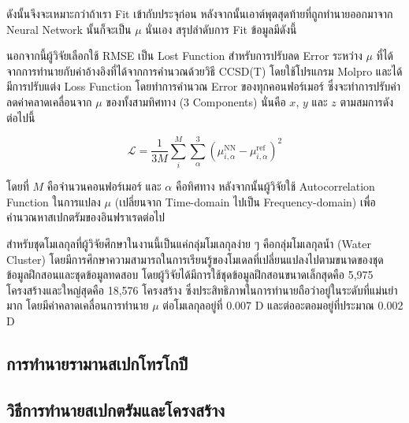 \noindent ดังนั้นจึงจะเหมาะกว่าถ้าเรา Fit เข้ากับประจุก่อน หลังจากนั้นเอาต์พุตสุดท้ายที่ถูกทำนายออกมาจาก Neural Network นั้นก็จะเป็น $\mu$ นั่นเอง สรุปลำดับการ Fit ข้อมูลมีดังนี้


นอกจากนี้ผู้วิจัยเลือกใช้ RMSE เป็น Lost Function สำหรับการปรับลด Error ระหว่าง $\mu$ ที่ได้จากการทำนายกับค่าอ้างอิงที่ได้จากการคำนวณด้วยวิธี CCSD(T) โดยใช้โปรแกรม Molpro และได้มีการปรับแต่ง Loss Function โดยทำการคำนวณ Error ของทุกคอนฟอร์เมอร์ ซึ่งจะทำการปรับค่าลดค่าคลาดเคลื่อนจาก $\mu$ ของทั้งสามทิศทาง (3 Components) นั่นคือ $x$, $y$ และ $z$ ตามสมการดังต่อไปนี้

\begin{equation}
    \mathcal{L} = \frac{1}{3M} \sum^{M}_{i} \sum^{3}_{\alpha} (\mu^{\text{NN}}_{i,\alpha}
    - \mu^{\text{ref}}_{i,\alpha})^{2}
\end{equation}

\noindent โดยที่ $M$ คือจำนวนคอนฟอร์เมอร์ และ $\alpha$ คือทิศทาง หลังจากนั้นผู้วิจัยใช้ Autocorrelation Function ในการแปลง $\mu$ (เปลี่ยนจาก Time-domain ไปเป็น Frequency-domain) เพื่อคำนวณหาสเปกตรัมของอินฟราเรดต่อไป

สำหรับชุดโมเลกุลที่ผู้วิจัยศึกษาในงานนี้เป็นแค่กลุ่มโมเลกุลง่าย ๆ คือกลุ่มโมเลกุลน้ำ (Water Cluster) โดยมีการศึกษาความสามารถในการเรียนรู้ของโมเดลที่เปลี่ยนแปลงไปตามขนาดของชุดข้อมูลฝึกสอนและชุดข้อมูลทดสอบ โดยผู้วิจัยได้มีการใช้ชุดข้อมูลฝึกสอนขนาดเล็กสุดคือ 5,975 โครงสร้างและใหญ่สุดคือ 18,576 โครงสร้าง ซึ่งประสิทธิภาพในการทำนายถือว่าอยู่ในระดับที่แม่นยำมาก โดยมีค่าคลาดเคลื่อนการทำนาย $\mu$ ต่อโมเลกุลอยู่ที่ 0.007 D และต่ออะตอมอยู่ที่ประมาณ 0.002 D

\subsection{การทำนายรามานสเปกโทรโกปี}
\label{ssec:pred_spec_raman}


\subsection{วิธีการทำนายสเปกตรัมและโครงสร้าง}
\label{ssec:pred_spec_struct}

